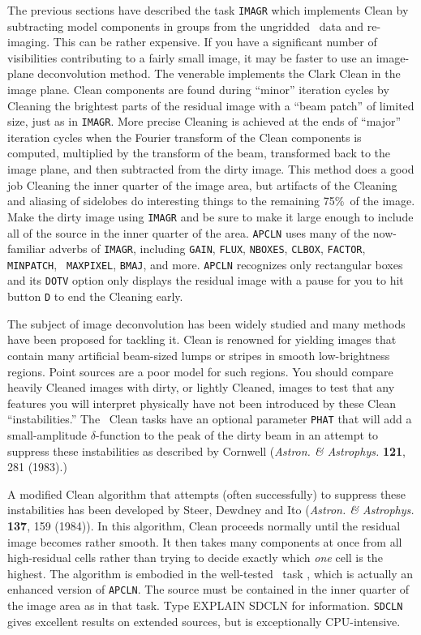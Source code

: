      The previous sections have described the task {\tt IMAGR} which
implements Clean by subtracting model components in groups from the
ungridded \uv\ data and re-imaging.  This can be rather expensive.  If
you have a significant number of visibilities contributing to a fairly
small image, it may be faster to use an image-plane deconvolution
method.  The venerable {\tt {}} implements the Clark Clean
in the image plane.  Clean components are found during ``minor''
iteration cycles by Cleaning the brightest parts of the residual image
with a ``beam patch'' of limited size, just as in {\tt IMAGR}\@.  More
precise Cleaning is achieved at the ends of ``major'' iteration cycles
when the Fourier transform of the Clean components is computed,
multiplied by the transform of the beam, transformed back to the image
plane, and then subtracted from the dirty image.  This method does a
good job Cleaning the inner quarter of the image area, but artifacts
of the Cleaning and aliasing of sidelobes do interesting things to the
remaining 75\%\ of the image.  Make the dirty image using {\tt IMAGR}
and be sure to make it large enough to include all of the source in
the inner quarter of the area.  {\tt APCLN} uses many of the
now-familiar adverbs of {\tt IMAGR}, including {\tt GAIN}, {\tt FLUX},
{\tt NBOXES}, {\tt CLBOX}, {\tt FACTOR}, {\tt MINPATCH}, {\tt
MAXPIXEL}, {\tt BMAJ}, and more.  {\tt APCLN} recognizes only
rectangular boxes and its {\tt DOTV} option only displays the residual
image with a pause for you to hit button {\tt D} to end the Cleaning
early.

     The subject of image deconvolution has been widely studied and
many methods have been proposed for tackling it.  Clean is renowned
for yielding images that contain many artificial beam-sized lumps or
stripes in smooth low-brightness regions.  Point sources are a poor
model for such regions.  You should compare heavily Cleaned images
with dirty, or lightly Cleaned, images to test that any features you
will interpret physically have not been introduced by these Clean
``instabilities.''  The \AIPS\ Clean tasks have an optional parameter
{\tt PHAT} that will add a small-amplitude $\delta$-function to the
peak of the dirty beam in an attempt to suppress these instabilities
as described by Cornwell ({\it Astron. \& Astrophys.} {\bf 121}, 281
(1983).)

     A modified Clean algorithm that attempts (often successfully)
to suppress these instabilities has been developed by Steer, Dewdney and
Ito ({\it Astron.  \& Astrophys.} {\bf 137}, 159 (1984)).  In this
algorithm, Clean proceeds normally until the residual image becomes
rather smooth.  It then takes many components at once from all
high-residual cells rather than trying to decide exactly which {\it
one\/} cell is the highest.  The algorithm is embodied in the
well-tested \AIPS\ task {\tt {}}, which is actually an
enhanced version of {\tt APCLN}\@.  The source must be contained in
the inner quarter of the image area as in that task.  Type {\us
EXPLAIN SDCLN \CR} for information.  {\tt SDCLN} gives excellent
results on extended sources, but is exceptionally CPU-intensive.

